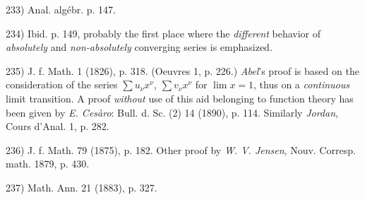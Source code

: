 \vfill
\leftline{\rule{2in}{0.4pt}}
\vspace{0.2cm}
{
\footnotesize
233) Anal. algébr. p. 147.

234) Ibid. p. 149, probably the first place where the \textit{different} behavior of \textit{absolutely} and \textit{non-absolutely} converging series is emphasized.

235) J. f. Math. 1 (1826), p. 318. (Oeuvres 1, p. 226.) \textit{Abel}'s proof is based on the consideration of the series $\sum u_\nu x^\nu$, $\sum v_\nu x^\nu$ for $\lim x = 1$, thus on a \textit{continuous} limit transition. A proof \textit{without} use of this aid belonging to function theory has been given by \textit{E. Cesàro}: Bull. d. Sc. (2) 14 (1890), p. 114. Similarly \textit{Jordan}, Cours d'Anal. 1, p. 282.

236) J. f. Math. 79 (1875), p. 182. Other proof by \textit{W. V. Jensen}, Nouv. Corresp. math. 1879, p. 430.

237) Math. Ann. 21 (1883), p. 327.

}